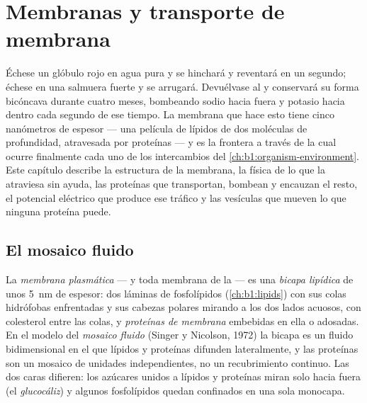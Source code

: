 \chapter{Membranas y transporte de membrana}\label{ch:b1:membranes-transport}

Échese un glóbulo rojo en agua pura y se hinchará y reventará en un segundo;
échese en una salmuera fuerte y se arrugará. Devuélvase al  y
conservará su forma bicóncava durante cuatro meses, bombeando sodio hacia
fuera y potasio hacia dentro cada segundo de ese tiempo. La membrana que
hace esto tiene cinco nanómetros de espesor --- una película de lípidos de
dos moléculas de profundidad, atravesada por proteínas --- y es la frontera
a través de la cual ocurre finalmente cada uno de los intercambios del
\cref{ch:b1:organism-environment}. Este capítulo describe la estructura de
la membrana, la física de lo que la atraviesa sin ayuda, las proteínas que
transportan, bombean y encauzan el resto, el potencial eléctrico que produce
ese tráfico y las vesículas que mueven lo que ninguna proteína puede.

\section{El mosaico fluido}

\begin{definition}\label{def:b1:membranes-transport:membrane}
La \emph{membrana plasmática} --- y toda membrana
de la  --- es una \emph{bicapa lipídica} de
unos \qty{5}{nm} de espesor: dos láminas de fosfolípidos
(\cref{ch:b1:lipids}) con sus colas hidrófobas enfrentadas y sus cabezas
polares mirando a los dos lados acuosos, con colesterol entre las colas, y
\emph{proteínas de membrana} embebidas en ella o
adosadas. En el modelo del \emph{mosaico fluido} (Singer y Nicolson, 1972) la bicapa es un fluido bidimensional en
el que lípidos y proteínas difunden lateralmente, y las proteínas son un
mosaico de unidades independientes, no un recubrimiento continuo. Las dos
caras difieren: los azúcares unidos a lípidos y proteínas miran solo hacia
fuera (el \emph{glucocáliz}) y algunos fosfolípidos quedan confinados en una
sola monocapa.
\end{definition}

